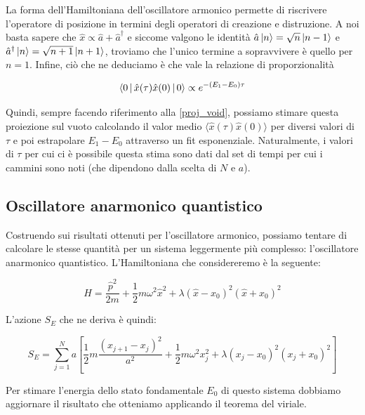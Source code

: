 \documentclass[11pt, a4paper]{article}
\begin{document}
La forma dell'Hamiltoniana dell'oscillatore armonico permette di riscrivere l'operatore di posizione in termini degli operatori di creazione e distruzione.
A noi basta sapere che $\hat{x} \propto \hat{a} + \hat{a}^\dagger$ e siccome valgono le identità $\hat{a} \Ket{n} = \sqrt{n} \Ket{n - 1}$ e $\hat{a}^\dagger \Ket{n} = \sqrt{n + 1} \Ket{n + 1}$,
troviamo che l'unico termine a sopravvivere è quello per $n=1$. Infine, ciò che ne deduciamo è che vale la relazione di proporzionalità

\begin{equation}
  \label{deltae_prop}
  \Braket{0 | \hat{x}(\tau) \hat{x}(0) | 0} \propto e^{-\left(E_1 - E_0\right) \tau}
\end{equation}

Quindi, sempre facendo riferimento alla \eqref{proj_void}, possiamo stimare questa proiezione sul vuoto calcolando il valor medio $\langle \hat{x}(\tau) \hat{x}(0) \rangle$ per diversi valori di $\tau$ e poi estrapolare $E_1 - E_0$ attraverso un fit esponenziale.
Naturalmente, i valori di $\tau$ per cui ci è possibile questa stima sono dati dal set di tempi per cui i cammini sono noti (che dipendono dalla scelta di $N$ e $a$).


\subsection{Oscillatore anarmonico quantistico}

Costruendo sui risultati ottenuti per l'oscillatore armonico, possiamo tentare di calcolare le stesse quantità per un sistema leggermente più complesso: l'oscillatore anarmonico quantistico. L'Hamiltoniana che considereremo è la seguente:


\begin{equation}
  H = \frac{\hat{p}^2}{2m} + \frac{1}{2} m \omega^2 \hat{x}^2 + \lambda \left(\hat{x} - x_0\right)^2 \left(\hat{x} + x_0\right)^2
\end{equation}


L'azione $S_E$ che ne deriva è quindi:

\begin{equation}
  S_E = \sum_{j=1}^N a \left[\frac{1}{2} m \frac{\left(x_{j+1} - x_{j}\right)^2}{a^2} + \frac{1}{2} m \omega ^ 2 x_j^2 + \lambda \left(x_j - x_0\right)^2 \left(x_j + x_0\right)^2\right]
\end{equation}

Per stimare l'energia dello stato fondamentale $E_0$ di questo sistema dobbiamo aggiornare il risultato che otteniamo applicando il teorema del viriale.
\end{document}
